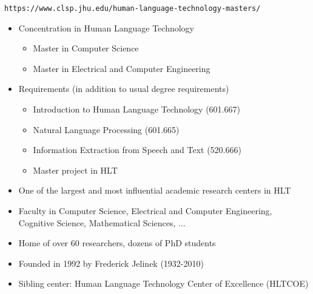 \documentclass[landscape]{jhuslides3C}
\begin{document}
\vfill
\begin{center}
\tt https://www.clsp.jhu.edu/human-language-technology-masters/
\end{center}
\begin{itemize}
\item Concentration in Human Language Technology
\begin{itemize}
\item Master in Computer Science
\item Master in Electrical and Computer Engineering
\end{itemize}
\item Requirements (in addition to usual degree requirements)
\begin{itemize}
\item Introduction to Human Language Technology (601.667)
\item Natural Language Processing (601.665)
\item Information Extraction from Speech and Text (520.666)
\item Master project in HLT
\end{itemize}
\end{itemize}
\vfill


\vfill
\begin{itemize}
\item One of the largest and most influential academic research centers in HLT
\item Faculty in Computer Science, Electrical and Computer Engineering, Cognitive Science, Mathematical Sciences, ...
\item Home of over 60 researchers, dozens of PhD students
\item Founded in 1992 by Frederick Jelinek (1932-2010)
\item Sibling center: Human Language Technology Center of Excellence (HLTCOE)
\end{itemize}
\vfill

\end{document}
